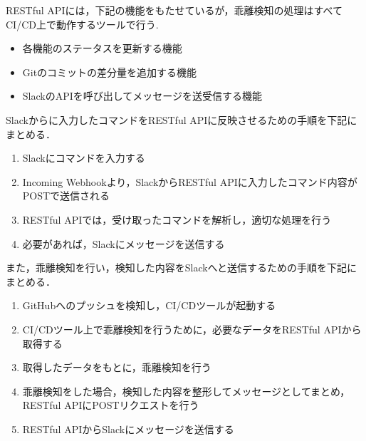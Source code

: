 RESTful APIには，下記の機能をもたせているが，乖離検知の処理はすべてCI/CD上で動作するツールで行う.
\begin{itemize}
    \item 各機能のステータスを更新する機能
    \item Gitのコミットの差分量を追加する機能
    \item SlackのAPIを呼び出してメッセージを送受信する機能
\end{itemize}

Slackからに入力したコマンドをRESTful APIに反映させるための手順を下記にまとめる．
\begin{enumerate}
    \item Slackにコマンドを入力する
    \item Incoming Webhookより，SlackからRESTful APIに入力したコマンド内容がPOSTで送信される
    \item RESTful APIでは，受け取ったコマンドを解析し，適切な処理を行う
    \item 必要があれば，Slackにメッセージを送信する
\end{enumerate}

また，乖離検知を行い，検知した内容をSlackへと送信するための手順を下記にまとめる．
\begin{enumerate}
    \item GitHubへのプッシュを検知し，CI/CDツールが起動する
    \item CI/CDツール上で乖離検知を行うために，必要なデータをRESTful APIから取得する
    \item 取得したデータをもとに，乖離検知を行う
    \item 乖離検知をした場合，検知した内容を整形してメッセージとしてまとめ，RESTful APIにPOSTリクエストを行う
    \item RESTful APIからSlackにメッセージを送信する
\end{enumerate}

